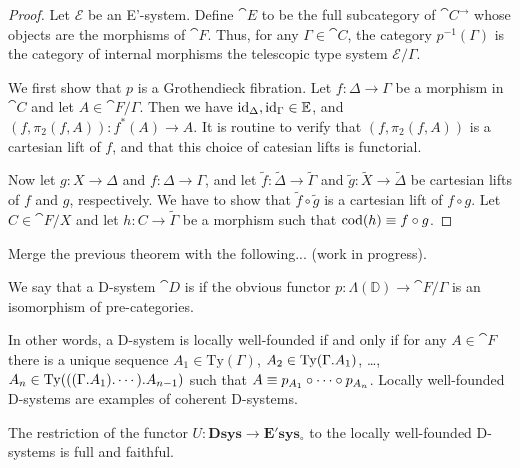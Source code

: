 \begin{proof}
Let $\mathcal{E}$ be an E'-system. Define $\cat{E}$ to be the full subcategory
of $\cat{C}^\to$ whose objects are the morphisms of $\cat{F}$. Thus, for any
$\Gamma\in\cat{C}$, the category $p^{-1}(\Gamma)$ is the category of internal
morphisms the telescopic type system $\mathcal{E}/\Gamma$. 

We first show that $p$ is a Grothendieck fibration. Let $f:\Delta\to\Gamma$ be
a morphism in $\cat{C}$ and let $A\in\cat{F}/\Gamma$. Then we have ${\mathrm{id}_{\Delta}},{\mathrm{id}_{\Gamma}}\in\mathbb{E}$,
and $(f,\pi_2(f,A)):f^\ast(A)\to A$. It is routine to verify that $(f,\pi_2(f,A))$
is a cartesian lift of $f$, and that this choice of catesian lifts is functorial. 

Now let $g:X\to\Delta$ and $f:\Delta\to \Gamma$, and let $\tilde{f}:\tilde{\Delta}\to\tilde{\Gamma}$ and
$\tilde{g}:\tilde{X}\to\tilde{\Delta}$ be cartesian lifts of $f$ and $g$, respectively. We have to show
that $\tilde{f}\circ \tilde{g}$ is a cartesian lift of $f\circ g$. Let $C\in\cat{F}/X$ and
let $h : C\to \tilde{\Gamma}$ be a morphism such that $\mathrm{cod}(h)\equiv f\circ g$. 
\end{proof}

Merge the previous theorem with the following... (work in progress).

\begin{defn}
We say that a D-system $\cat{D}$ is  if the obvious functor
$p:\Lambda(\mathbb{D})\to\cat{F}/\Gamma$ is an isomorphism of pre-categories.
\end{defn}

\begin{rmk}
In other words, a D-system is locally well-founded if and only if
for any $A\in\cat{F}$ there is a unique sequence
$A_1\in\mathrm{Ty}(\Gamma)$, $A_2\in\mathrm{Ty}(\ctxext{\Gamma}{A_1})$, \ldots,
$A_n\in\mathrm{Ty}(\ctxext{{{\Gamma}{A_1}}{\cdots}}{A_{n-1}})$ such that
$A\equiv p_{A_1}\circ\cdots\circ p_{A_n}$. Locally well-founded D-systems 
are examples of coherent D-systems.
\end{rmk}

\begin{thm}
The restriction of the functor $U:\mathbf{Dsys}\to\mathbf{E'sys_{\circ}}$ to the
locally well-founded D-systems is full and faithful.
\end{thm}

